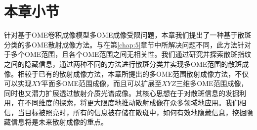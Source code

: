 \section{本章小节}
针对基于OME卷积成像模型多OME成像受限问题，本章我们提出了一种基于散斑分类的多OME散射成像方法。与在第\ref{chap:5}章节中所解决问题不同，此方法针对于多个OME范围，且各个OME范围之间无相关性。我们通过研究并探索散斑指纹之间的隐藏信息，通过两种不同的方法进行散斑分类并实现多OME范围的散斑成像。相较于已有的散射成像方法，本章所提出的多OME范围散射成像方法，不仅可以实现$XY$平面多OME范围成像，而且可以扩展至$XYZ$三维多OME范围成像，同时也又潜力扩展透过散射介质光谱成像。其核心思想在于对散斑信息的发掘利用，在不同维度的探索，将更大限度地推动散射成像在众多领域地应用。我们相信，当目标被照亮时，所有的信息被存储在散斑中，如何有效地隐藏信息，挖掘隐藏信息将是未来散射成像的重点。
